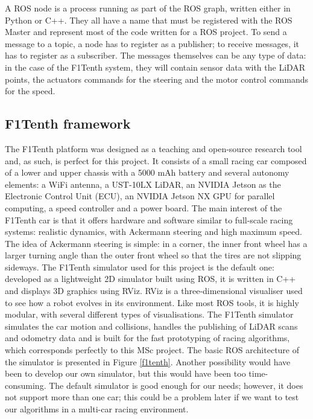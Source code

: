 A ROS node is a process running as part of the ROS graph, written either in Python or C++. They all have a name that must be registered with the ROS Master and represent most of the code written for a ROS project. To send a message to a topic, a node has to register as a publisher; to receive messages, it has to register as a subscriber. The messages themselves can be any type of data: in the case of the F1Tenth system, they will contain sensor data with the LiDAR points, the actuators commands for the steering and the motor control commands for the speed.


\subsection{F1Tenth framework}

The F1Tenth platform was designed as a teaching and open-source research tool and, as such, is perfect for this project. It consists of a small racing car composed of a lower and upper chassis with a 5000 mAh battery and several autonomy elements: a WiFi antenna, a UST-10LX LiDAR, an NVIDIA Jetson as the Electronic Control Unit (ECU), an NVIDIA Jetson NX GPU for parallel computing, a speed controller and a power board. \newline
The main interest of the F1Tenth car is that it offers hardware and software similar to full-scale racing systems: realistic dynamics, with Ackermann steering and high maximum speed. The idea of Ackermann steering is simple: in a corner, the inner front wheel has a larger turning angle than the outer front wheel so that the tires are not slipping sideways. \newline 
The F1Tenth simulator used for this project is the default one: developed as a lightweight 2D simulator built using ROS, it is written in C++ and displays 3D graphics using RViz. RViz is a three-dimensional visualiser used to see how a robot evolves in its environment. Like most ROS tools, it is highly modular, with several different types of visualisations. The F1Tenth simulator simulates the car motion and collisions, handles the publishing of LiDAR scans and odometry data and is built for the fast prototyping of racing algorithms, which corresponds perfectly to this MSc project. The basic ROS architecture of the simulator is presented in Figure \ref{f1tenth}. Another possibility would have been to develop our own simulator, but this would have been too time-consuming. The default simulator is good enough for our needs; however, it does not support more than one car; this could be a problem later if we want to test our algorithms in a multi-car racing environment.

